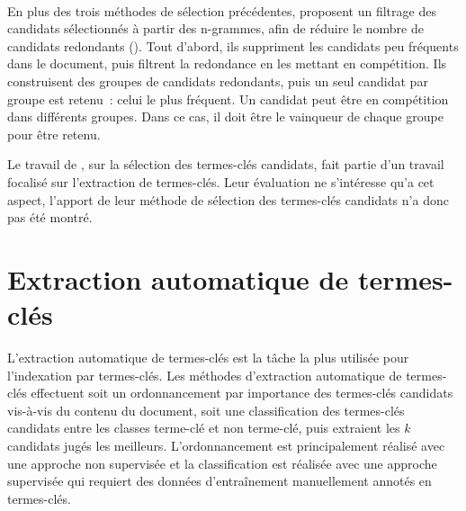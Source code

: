    \begin{example}
    \end{example}

    ~\\En plus des trois méthodes de sélection précédentes,
     proposent un filtrage
    des candidats sélectionnés à partir des n-grammes, afin de réduire le nombre
    de candidats redondants (). Tout d'abord, ils suppriment les
    candidats peu fréquents dans le document, puis filtrent la redondance en les
    mettant en compétition. Ils construisent des groupes de candidats
    redondants, puis un seul candidat par groupe est retenu~: celui le plus
    fréquent. Un candidat peut être en compétition dans différents groupes. Dans
    ce cas, il doit être le \og{}vainqueur\fg{} de chaque groupe pour être
    retenu.

    Le travail de , sur la
    sélection des termes-clés candidats, fait partie d'un travail focalisé sur
    l'extraction de termes-clés. Leur évaluation ne s'intéresse qu'a cet aspect,
    l'apport de leur méthode de sélection des termes-clés candidats n'a donc pas
    été montré.


  \section{Extraction automatique de termes-clés}
  \label{sec:main-state_of_the_art-automatic_keyphrase_extraction}
    L'extraction automatique de termes-clés est la tâche la plus utilisée pour
    l'indexation par termes-clés. Les méthodes d'extraction automatique de
    termes-clés effectuent soit un ordonnancement par importance des termes-clés
    candidats vis-à-vis du contenu du document, soit une classification des
    termes-clés candidats entre les classes \og{}terme-clé\fg{} et \og{}non
    terme-clé\fg{}, puis extraient les $k$ candidats jugés les meilleurs.
    L'ordonnancement est principalement réalisé avec une approche non supervisée
    et la classification est réalisée avec une approche supervisée qui requiert
    des données d'entraînement manuellement annotés en termes-clés.


